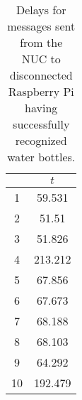 \begin{appendices}
\begin{table}[H]
	\centering
	\begin{tabular}{c|c}\toprule
		& $t$  \\ \midrule
		1&	59.531\\
		2&	51.51\\
		3&	51.826\\
		4&	213.212\\
		5&	67.856\\
		6&	67.673\\
		7&	68.188\\
		8&	68.103\\
		9&	64.292\\
		10&	192.479\\
		\end{tabular}
	\caption{Delays for messages sent from the NUC to disconnected Raspberry Pi having successfully recognized water bottles.}
	\label{table:DIS3-trdulyd}
\end{table}

\end{appendices}

